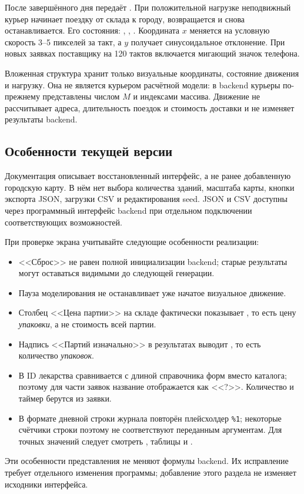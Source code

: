 После завершённого дня  передаёт
.
При положительной нагрузке неподвижный курьер начинает поездку от склада
к городу, возвращается и снова останавливается. Его состояния:
, , .
Координата $x$ меняется на условную скорость 3--5 пикселей за такт,
а $y$ получает синусоидальное отклонение. При новых заявках поставщику
на 120 тактов включается мигающий значок телефона.

Вложенная структура  хранит только визуальные
координаты, состояние движения и нагрузку. Она не является курьером
расчётной модели: в backend курьеры по-прежнему представлены числом $M$
и индексами массива. Движение не рассчитывает адреса, длительность поездок
и стоимость доставки и не изменяет результаты backend.

\subsection{Особенности текущей версии}
Документация описывает восстановленный интерфейс, а не ранее добавленную
городскую карту. В нём нет выбора количества зданий, масштаба карты,
кнопки экспорта JSON, загрузки CSV и редактирования seed.
JSON и CSV доступны через программный интерфейс backend при отдельном
подключении соответствующих возможностей.

При проверке экрана учитывайте следующие особенности реализации:
\begin{itemize}
  \item <<Сброс>> не равен полной инициализации backend; старые результаты
        могут оставаться видимыми до следующей генерации.
  \item Пауза моделирования не останавливает уже начатое визуальное движение.
  \item Столбец <<Цена партии>> на складе фактически показывает
        , то есть цену \emph{упаковки}, а не стоимость всей партии.
  \item Надпись <<Партий изначально>> в результатах выводит
        , то есть количество \emph{упаковок}.
  \item В  ID лекарства сравнивается с длиной
        справочника форм вместо каталога; поэтому для части заявок название
        отображается как <<?>>. Количество и таймер берутся из заявки.
  \item В формате дневной строки журнала повторён плейсхолдер
        \texttt{\%1}; некоторые счётчики строки поэтому не соответствуют
        переданным аргументам. Для точных значений следует смотреть
        , таблицы и .
\end{itemize}
Эти особенности представления не меняют формулы backend. Их исправление
требует отдельного изменения программы; добавление этого раздела
не изменяет исходники интерфейса.

